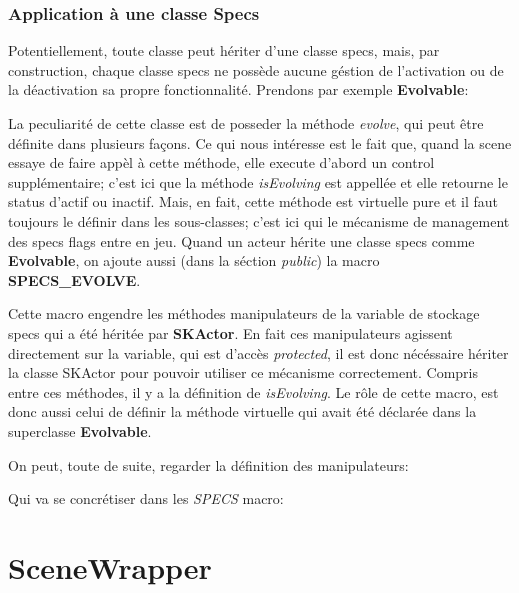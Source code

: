 \documentclass{report}
\begin{document}
\subsubsection{Application à une classe Specs}

Potentiellement, toute classe peut hériter d'une classe specs, mais, 
par construction, chaque classe specs ne possède aucune géstion de l'activation 
ou de la déactivation sa propre fonctionnalité.
Prendons par exemple \textbf{Evolvable}:



La peculiarité de cette classe est de posseder la méthode \textit{evolve}, qui 
peut être définite dans plusieurs façons. Ce qui nous intéresse est le fait que,
quand la scene essaye de faire appèl à cette méthode, elle execute d'abord un
control supplémentaire; c'est ici que la méthode \textit{isEvolving} est
appellée et elle retourne le status d'actif ou inactif.
Mais, en fait, cette méthode est virtuelle pure et il faut toujours le définir
dans les sous-classes; c'est ici qui le mécanisme de management des specs flags 
entre en jeu. 
Quand un acteur hérite une classe specs comme \textbf{Evolvable}, on ajoute
aussi (dans la séction \textit{public}) la macro \textbf{SPECS\_EVOLVE}.



Cette macro engendre les méthodes manipulateurs de la variable de stockage specs 
qui a été héritée par \textbf{SKActor}. En fait ces manipulateurs agissent
directement sur la variable, qui est d'accès \textit{protected}, il est donc 
nécéssaire hériter la classe SKActor pour pouvoir utiliser ce mécanisme correctement.
Compris entre ces méthodes, il y a la définition de \textit{isEvolving}. 
Le rôle de cette macro, est donc aussi celui de définir la méthode virtuelle 
qui avait été déclarée dans la superclasse \textbf{Evolvable}.
\par
\par
On peut, toute de suite, regarder la définition des manipulateurs:



Qui va se concrétiser dans les \textit{SPECS} macro:



\section{SceneWrapper}
 
\end{document}
